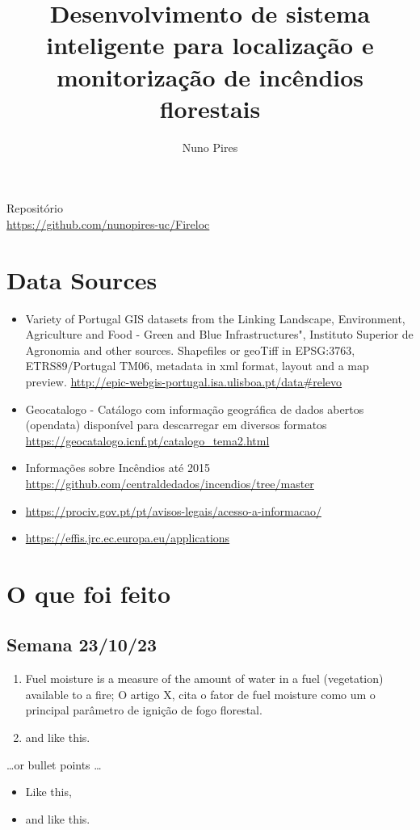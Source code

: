 \documentclass{article}
\title{Desenvolvimento de sistema inteligente para localização e monitorização de incêndios florestais}
\author{Nuno Pires}
\begin{document}
\maketitle

\begin{center}
Repositório\\
\url{https://github.com/nunopires-uc/Fireloc}
\end{center}


\section{Data Sources}
\begin{itemize}
    \item Variety of Portugal GIS datasets from the Linking Landscape, Environment, Agriculture and Food - Green and Blue Infrastructures", Instituto Superior de Agronomia and other sources. Shapefiles or geoTiff in EPSG:3763, ETRS89/Portugal TM06, metadata in xml format, layout and a map preview. \url{http://epic-webgis-portugal.isa.ulisboa.pt/data#relevo}
    \item Geocatalogo - Catálogo com informação geográfica de dados abertos (opendata) disponível para descarregar em diversos formatos \url{https://geocatalogo.icnf.pt/catalogo_tema2.html}
    \item Informações sobre Incêndios até 2015 \url{https://github.com/centraldedados/incendios/tree/master}
    \item \url{https://prociv.gov.pt/pt/avisos-legais/acesso-a-informacao/}
    \item \url{https://effis.jrc.ec.europa.eu/applications}
\end{itemize}

\section{O que foi feito}
\subsection{Semana 23/10/23}
\begin{enumerate}
\item Fuel moisture is a measure of the amount of water in a fuel (vegetation) available to a fire; O artigo X, cita o fator de fuel moisture como um o principal parâmetro de ignição de fogo florestal. 
\item and like this.
\end{enumerate}
\dots or bullet points \dots
\begin{itemize}
\item Like this,
\item and like this.
\end{itemize}
\end{document}
